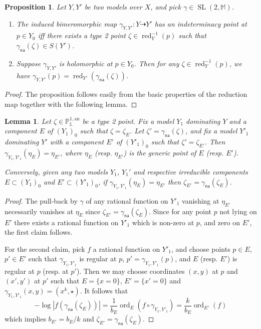 \documentclass[10pt]{amsart}
\newtheorem{lemm}[theo]{Lemma}\newtheorem{prop}[theo]{Proposition}\newtheorem{coro}[theo]{Corollary}\newtheorem{conj}[theo]{Conjecture}
\theoremstyle{definition}\newtheorem{defi}[theo]{Definition}\newtheorem{rema}[theo]{Remark}\newtheorem{exam}[theo]{Example}\newtheorem{exem}[theo]{Example}\newtheorem{nota}[theo]{Notation}
\DeclareMathOperator{\red}{red}
\DeclareMathOperator{\ord}{ord}
\DeclareMathOperator{\SL}{SL}
\newcommand{\mm}{\mathbb{M}}
\newcommand{\an}{\mathrm{an}}
\newcommand{\berkl}{\mathbb P^{1,\an}_{\Laurent}}
\newcommand{\Laurent}{\mathbb{L}}
\newcommand{\na}{\mathsf{na}}
\begin{document}
\begin{prop}\label{prop:val-geom}
Let $Y,Y'$ be two models over $X$, and pick $\gamma\in \SL(2,\mm)$.
\begin{enumerate}
\item The induced bimeromorphic map $\gamma_{Y,Y'}: Y \dashrightarrow Y'$ has an indeterminacy point at $p\in Y_0$ iff there exists a type 2 point $\zeta \in \red^{-1}_{Y}(p)$ such that $\gamma_\na(\zeta) \in S(Y')$.
\item Suppose $\gamma_{Y,Y'}$ is holomorphic at $p\in Y_0$. Then for any $\zeta \in \red_{Y}^{-1}(p)$, we have $\gamma_{Y,Y'}(p) = \red_{Y'} (\gamma_\na(\zeta))$.
\end{enumerate}
\end{prop}

\begin{proof}
The proposition follows easily from the basic properties of the reduction map together with the following lemma.
\end{proof}

\begin{lemm}
Let $\zeta\in\berkl$ be a type 2 point. Fix a model $Y_1$ dominating $Y$ and a component $E$ of $(Y_1)_0$ such that $\zeta = \zeta_E$. Let $\zeta' = \gamma_\na(\zeta)$, and fix a model $Y'_1$ dominating $Y'$ with a component $E'$ of $(Y'_1)_0$ such that $\zeta' = \zeta_{E'}$. Then $\gamma_{Y_1, Y'_1}(\eta_E) = \eta_{E'}$, where $\eta_E$ (resp. $\eta_{E'}$) is the generic point of $E$ (resp. $E'$).

Conversely, given any two models $Y_1$, $Y_1'$ and respective irreducible components $E \subset (Y_1)_0$ and $E' \subset (Y'_1)_0$, if $\gamma_{Y_1, Y'_1}(\eta_E) = \eta_{E'}$ then $\zeta_{E'} = \gamma_\na(\zeta_{E})$.
\end{lemm}

\begin{proof}
The pull-back by $\gamma$ of any rational function on $Y'_1$ vanishing at $\eta_{E'}$ necessarily vanishes at $\eta_E$ since $\zeta_{E'} = \gamma_\na(\zeta_E)$. Since for any point $p$ not lying on $E'$ there exists a rational function on $Y'_1$ which is non-zero at $p$, and zero on $E'$, the first claim follows.

For the second claim, pick $f$ a rational function on $Y'_1$, and choose points $p\in E$, $p'\in E'$ such that $\gamma_{Y_1, Y'_1}$ is regular at $p$, $p' = \gamma_{Y_1, Y'_1}(p)$, and $E$ (resp. $E'$) is regular at $p$ (resp. at $p'$). Then we may choose coordinates $(x,y)$ at $p$ and $(x',y')$ at $p'$ such that $E = \{ x=0\}$, $E' = \{ x'=0\}$ and $\gamma_{Y_1, Y'_1} (x,y) = (x^k, \star)$. It follows that
\[
-\log|f(\gamma_\na(\zeta_{E}))| = \frac1{b_E}\ord_{E}(f \circ \gamma_{Y_1, Y'_1}) = \frac{k}{b_E}\ord_{E'}(f)
\]
which implies $ b_{E'} = b_E/k$ and $\zeta_{E'} = \gamma_\na(\zeta_{E})$.
\end{proof}
\end{document}

